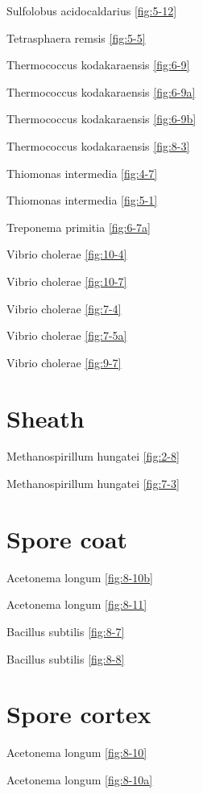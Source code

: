 \documentclass[]{tufte-book}
\begin{document}
Sulfolobus acidocaldarius \ref{fig:5-12}

Tetrasphaera remsis \ref{fig:5-5}

Thermococcus kodakaraensis \ref{fig:6-9}

Thermococcus kodakaraensis \ref{fig:6-9a}

Thermococcus kodakaraensis \ref{fig:6-9b}

Thermococcus kodakaraensis \ref{fig:8-3}

Thiomonas intermedia \ref{fig:4-7}

Thiomonas intermedia \ref{fig:5-1}

Treponema primitia \ref{fig:6-7a}

Vibrio cholerae \ref{fig:10-4}

Vibrio cholerae \ref{fig:10-7}

Vibrio cholerae \ref{fig:7-4}

Vibrio cholerae \ref{fig:7-5a}

Vibrio cholerae \ref{fig:9-7}

\hypertarget{sheath-1}{%
\section*{Sheath}\label{sheath-1}}

Methanospirillum hungatei \ref{fig:2-8}

Methanospirillum hungatei \ref{fig:7-3}

\hypertarget{spore-coat}{%
\section*{Spore coat}\label{spore-coat}}

Acetonema longum \ref{fig:8-10b}

Acetonema longum \ref{fig:8-11}

Bacillus subtilis \ref{fig:8-7}

Bacillus subtilis \ref{fig:8-8}

\hypertarget{spore-cortex}{%
\section*{Spore cortex}\label{spore-cortex}}

Acetonema longum \ref{fig:8-10}

Acetonema longum \ref{fig:8-10a}
\end{document}

